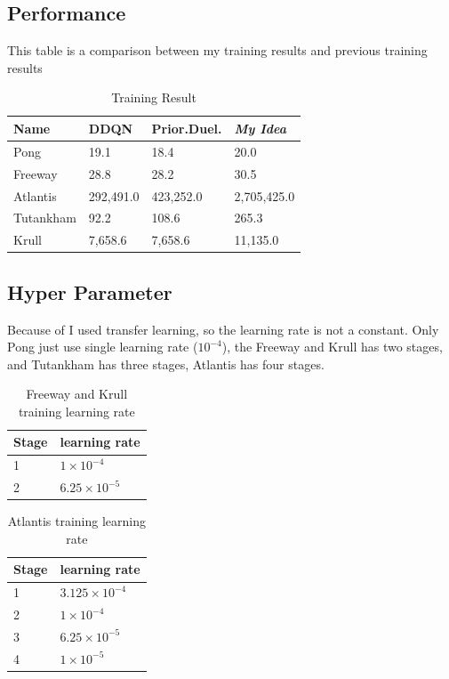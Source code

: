 \documentclass{article}
\begin{document}
\subsection{Performance}
This table is a comparison between my training results and previous training results
\begin{table}[H]
\centering
\begin{tabular}{llll}
\hline
Name  & DDQN & Prior.Duel. & \textit{My Idea} \\
\hline
Pong      & 19.1  & 18.4  & 20.0    \\
Freeway   & 28.8  & 28.2 &   30.5   \\
Atlantis  & 292,491.0  & 423,252.0   &  2,705,425.0 \\
Tutankham & 92.2  & 108.6 & 265.3 \\
Krull     & 7,658.6  & 7,658.6 & 11,135.0 \\
\hline
\end{tabular}
\caption{Training Result}
\label{tab:plain}
\end{table}

\subsection{Hyper Parameter}
Because of I used transfer learning, so the learning rate is not a constant. Only Pong just
 use single learning rate ($10^{-4}$), the Freeway and Krull has two stages, and Tutankham has
 three stages, Atlantis has four stages.
 
\begin{table}[H]
\centering
\begin{tabular}{ll}
\hline
Stage  & learning rate \\
\hline
1 & $1 \times 10^{-4}$\\
2 & $6.25 \times 10^{-5}$ \\
\hline
\end{tabular}
\caption{Freeway and Krull training learning rate}
\label{tab:plain}
\end{table}

\begin{table}[H]
\centering
\begin{tabular}{ll}
\hline
Stage  & learning rate \\
\hline
1 & $3.125 \times 10^{-4}$ \\
2 & $1 \times 10^{-4}$\\
3 & $6.25 \times 10^{-5}$ \\
4 & $1 \times 10^{-5}$ \\
\hline
\end{tabular}
\caption{Atlantis training learning rate}
\label{tab:plain}
\end{table}
\end{document}
